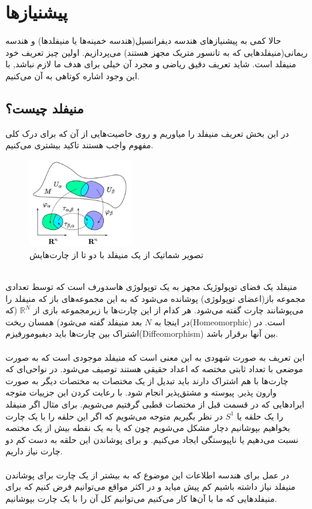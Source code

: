 \section{پیشنیازها}
حالا کمی به پیشنیازهای هندسه دیفرانسیل(هندسه خمینه‌ها یا منیفلدها) و هندسه ریمانی(منیفلدهایی که به تانسور متریک مجهز هستند) می‌پردازیم. اولین چیز تعریف خود منیفلد است. شاید تعریف دقیق ریاضی و مجرد آن خیلی برای هدف ما لازم نباشد, با این وجود اشاره کوتاهی به آن می‌کنیم.
\subsection{منیفلد چیست؟}
در این بخش تعریف منیفلد را میاوریم و روی خاصیت‌هایی از آن که برای درک کلی مفهوم واجب هستند تاکید بیشتری می‌کنیم.
\begin{figure}[h!]
    \centering
    \includegraphics[width=0.4\textwidth]{Pictures/Q2/1.png}
    \caption{تصویر شماتیک از یک منیفلد با دو تا از چارت‌هایش}
\end{figure}\\
منیفلد یک فضای توپولوژیک مجهز به یک توپولوژی هاسدورف است که توسط تعدادی مجموعه باز(اعضای توپولوژی) پوشانده می‌شود که به این مجموعه‌های باز که منیفلد را می‌پوشانند چارت گفته می‌شود. هر کدام از این چارت‌ها با زیرمجموعه بازی از $\mathbb{R}^N$ (که در اینجا به $N$ بعد منیفلد گفته می‌شود) همسان ریخت(Homeomorphic) است. در اشتراک بین چارت‌ها باید دیفیومورفیزم(Diffeomorphism) بین آنها برقرار باشد.\\
\\
این تعریف به صورت شهودی به این معنی است که منیفلد موجودی است که به صورت موضعی با تعداد ثابتی مختصه که اعداد حقیقی هستند توصیف می‌شود. در نواحی‌ای که چارت‌ها با هم اشتراک دارند باید تبدیل از یک مختصات به مختصات دیگر به صورت وارون پذیر, پیوسته و مشتق‌پذیر انجام شود. با رعایت کردن این جزییات متوجه ایرادهایی که در قسمت قبل از مختصات قطبی گرفتیم می‌شویم. برای مثال اگر منیفلد را یک حلقه یا $S^1$ در نظر بگیریم متوجه می‌شویم که اگر این حلقه را با یک چارت بخواهیم بپوشانیم دچار مشکل می‌شویم چون که یا به یک نقطه بیش از یک مختصه نسبت می‌دهیم یا ناپیوستگی ایجاد می‌کنیم. و برای پوشاندن این حلقه به دست کم دو چارت نیاز داریم.\\
\\
در عمل برای هندسه اطلاعات این موضوع که به بیشتر از یک چارت برای پوشاندن منیفلد نیاز داشته باشیم کم پیش میاید و در اکثر مواقع می‌توانیم فرض کنیم که برای منیفلدهایی که ما با آن‌ها کار می‌کنیم می‌توانیم کل آن را با یک چارت بپوشانیم.
\pagebreak

